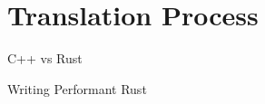 \documentclass[10pt,aspectratio=169]{beamer}
\begin{document}






\section{Translation Process}

\begin{frame}{C++ vs Rust}
\end{frame}

\begin{frame}{Writing Performant Rust}
\end{frame}
\end{document}
